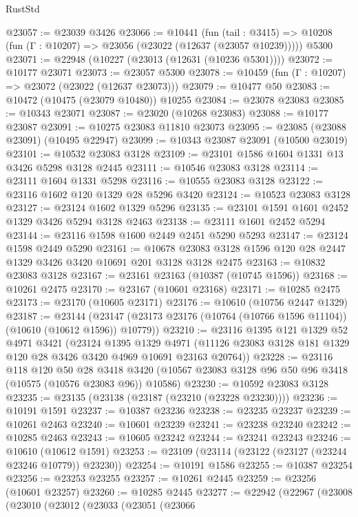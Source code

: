 \begin{lexlean}{RustStd}
\begin{coremodule}
@23057 := @23039 @3426
@23066 := @10441
    (fun (tail : @3415) => @10208 (fun (Γ : @10207) => @23056 (@23022 (@12637 (@23057 @10239)))))
    @5300
@23071 := @22948 (@10227 (@23013 (@12631 (@10236 @5301))))
@23072 := @10177 @23071
@23073 := @23057 @5300
@23078 := @10459 (fun (Γ : @10207) => @23072 (@23022 (@12637 @23073)))
@23079 := @10477 @50
@23083 := @10472 (@10475 (@23079 @10480)) @10255
@23084 := @23078 @23083
@23085 := @10343 @23071
@23087 := @23020 (@10268 @23083)
@23088 := @10177 @23087
@23091 := @10275 @23083 @11810 @23073
@23095 := @23085 (@23088 @23091) (@10495 @22947)
@23099 := @10343 @23087 @23091 (@10500 @23019)
@23101 := @10532 @23083 @3128
@23109 := @23101 @1586 @1604 @1331 @13 @3426 @5298 @3128 @2445
@23111 := @10546 @23083 @3128
@23114 := @23111 @1604 @1331 @5298
@23116 := @10555 @23083 @3128
@23122 := @23116 @1602 @120 @1329 @28 @5296 @3420
@23124 := @10523 @23083 @3128
@23127 := @23124 @1602 @1329 @5296
@23135 := @23101 @1591 @1601 @2452 @1329 @3426 @5294 @3128 @2463
@23138 := @23111 @1601 @2452 @5294
@23144 := @23116 @1598 @1600 @2449 @2451 @5290 @5293
@23147 := @23124 @1598 @2449 @5290
@23161 := @10678 @23083 @3128 @1596 @120 @28 @2447 @1329 @3426 @3420 @10691 @201 @3128 @3128 @2475
@23163 := @10832 @23083 @3128
@23167 := @23161 @23163 (@10387 (@10745 @1596))
@23168 := @10261 @2475
@23170 := @23167 (@10601 @23168)
@23171 := @10285 @2475
@23173 := @23170 (@10605 @23171)
@23176 := @10610 (@10756 @2447 @1329)
@23187 := @23144
    (@23147 (@23173 @23176 (@10764 (@10766 @1596 @11104)) (@10610 (@10612 @1596)) @10779))
@23210 := @23116
    @1395
    @121
    @1329
    @52
    @4971
    @3421
    (@23124
      @1395
      @1329
      @4971
      (@11126 @23083 @3128 @181 @1329 @120 @28 @3426 @3420 @4969 @10691 @23163 @20764))
@23228 := @23116
    @118
    @120
    @50
    @28
    @3418
    @3420
    (@10567 @23083 @3128 @96 @50 @96 @3418 (@10575 (@10576 @23083 @96)) @10586)
@23230 := @10592 @23083 @3128
@23235 := @23135 (@23138 (@23187 (@23210 (@23228 @23230))))
@23236 := @10191 @1591
@23237 := @10387 @23236
@23238 := @23235 @23237
@23239 := @10261 @2463
@23240 := @10601 @23239
@23241 := @23238 @23240
@23242 := @10285 @2463
@23243 := @10605 @23242
@23244 := @23241 @23243
@23246 := @10610 (@10612 @1591)
@23253 := @23109 (@23114 (@23122 (@23127 (@23244 @23246 @10779)) @23230))
@23254 := @10191 @1586
@23255 := @10387 @23254
@23256 := @23253 @23255
@23257 := @10261 @2445
@23259 := @23256 (@10601 @23257)
@23260 := @10285 @2445
@23277 := @22942
    (@22967
      (@23008
        (@23010
          (@23012
            (@23033
              (@23051
                (@23066

\end{coremodule}
\end{lexlean}
